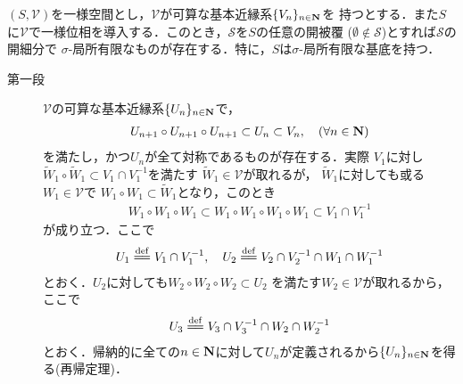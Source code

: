 	\begin{screen}
		\begin{thm}
		\label{thm:if_uniformity_has_countable_base_then_has_topology_has_sigma_locally_finite_base}
			$(S,\mathscr{V})$を一様空間とし，$\mathscr{V}$が可算な基本近縁系$\{V_n\}_{n \in \mathbf{N}}$を
			持つとする．また$S$に$\mathscr{V}$で一様位相を導入する．このとき，$\mathscr{S}$を$S$の任意の開被覆
			($\emptyset \notin \mathscr{S}$)とすれば$\mathscr{S}$の開細分で
			$\sigma$-局所有限なものが存在する．特に，$S$は$\sigma$-局所有限な基底を持つ．
		\end{thm}
	\end{screen}
	
	\begin{prf}\mbox{}
		\begin{description}
			\item[第一段] $\mathscr{V}$の可算な基本近縁系$\{U_n\}_{n \in \mathbf{N}}$で，
				\begin{align}
					U_{n+1} \circ U_{n+1} \circ U_{n+1} \subset U_n
					\subset V_n,\quad (\forall n \in \mathbf{N})
				\end{align}
				を満たし，かつ$U_n$が全て対称であるものが存在する．実際
				$V_1$に対し$\tilde{W}_1 \circ \tilde{W}_1 \subset V_1 \cap V_1^{-1}$を満たす
				$\tilde{W}_1 \in \mathscr{V}$が取れるが，
				$\tilde{W}_1$に対しても或る$W_1 \in \mathscr{V}$で
				$W_1 \circ W_1 \subset \tilde{W}_1$となり，このとき
				\begin{align}
					W_1 \circ W_1 \circ W_1
					\subset W_1 \circ W_1 \circ W_1 \circ W_1
					\subset V_1 \cap V_1^{-1}
				\end{align}
				が成り立つ．ここで
				\begin{align}
					U_1 \defeq V_1 \cap V_1^{-1},
					\quad U_2 \defeq V_2 \cap V_2^{-1} \cap W_1 \cap W_1^{-1}
				\end{align}
				とおく．$U_2$に対しても$W_2 \circ W_2 \circ W_2 \subset U_2$
				を満たす$W_2 \in \mathscr{V}$が取れるから，ここで
				\begin{align}
					U_3 \defeq V_3 \cap V_3^{-1} \cap W_2 \cap W_2^{-1}
				\end{align}
				とおく．帰納的に全ての$n \in \mathbf{N}$に対して$U_n$が定義されるから$\{U_n\}_{n \in \mathbf{N}}$を得る(再帰定理)．
				

\end{description}
\end{prf}
